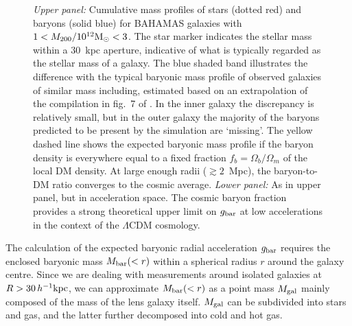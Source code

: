 \documentclass[usenatbib]{mnras}
\newcommand{\hkpc}{\, h^{-1}{\rm{kpc}} }
\newcommand{\un}[1]{_{\rm #1}}
\begin{document}
\begin{figure}
	\caption{\emph{Upper panel: }Cumulative mass profiles of stars (dotted red) and baryons (solid blue) for BAHAMAS galaxies with $1<M_{200}/10^{12}{\rm M}_\odot<3$. The star marker indicates the stellar mass within a $30$~kpc aperture, indicative of what is typically regarded as the stellar mass of a galaxy. The blue shaded band illustrates the difference with the typical baryonic mass profile of observed galaxies of similar mass including, estimated based on an extrapolation of the compilation in fig.~7 of \citet{tumlinson2017}. In the inner galaxy the discrepancy is relatively small, but in the outer galaxy the majority of the baryons predicted to be present by the simulation are `missing'. The yellow dashed line shows the expected baryonic mass profile if the baryon density is everywhere equal to a fixed fraction $f_b=\Omega_b/\Omega_m$ of the local DM density. At large enough radii ($\gtrsim 2$~Mpc), the baryon-to-DM ratio converges to the cosmic average. \emph{Lower panel: } As in upper panel, but in acceleration space. The cosmic baryon fraction provides a strong theoretical upper limit on $g\un{bar}$ at low accelerations in the context of the $\Lambda$CDM cosmology.}
	\label{fig:missing-baryons}
\end{figure}

The calculation of the expected baryonic radial acceleration $g\un{bar}$ requires the enclosed baryonic mass $M\un{bar}(<r)$ within a spherical radius $r$ around the galaxy centre. Since we are dealing with measurements around isolated galaxies at $R>30\hkpc$, we can approximate $M\un{bar}(<r)$ as a point mass $M\un{gal}$ mainly composed of the mass of the lens galaxy itself. $M\un{gal}$ can be subdivided into stars and gas, and the latter further decomposed into cold and hot gas.
\end{document}
